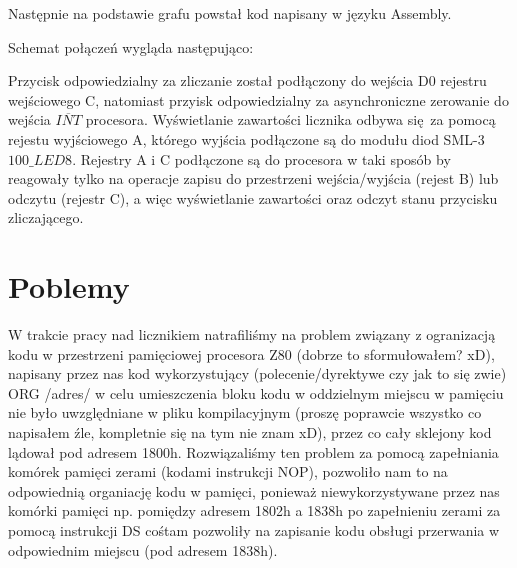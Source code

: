 \documentclass[fleqn]{article}
\begin{document}
Następnie na podstawie grafu powstał kod napisany w języku Assembly.

\noindent\begin{minipage}{.45\textwidth}
	
\end{minipage}\hfill
\noindent\begin{minipage}{.45\textwidth}
	
\end{minipage}\hfill

Schemat połączeń wygląda następująco:


Przycisk odpowiedzialny za zliczanie został podłączony do wejścia D0 rejestru wejściowego C, natomiast przyisk odpowiedzialny za asynchroniczne zerowanie do wejścia $\overline{INT}$ procesora.
Wyświetlanie zawartości licznika odbywa się za pomocą rejestu wyjściowego A, którego wyjścia podłączone są do modułu diod SML-3 $\textit{100\_LED8}$. Rejestry A i C podłączone są do procesora w taki sposób by reagowały tylko na operacje zapisu do przestrzeni wejścia/wyjścia (rejest B) lub odczytu (rejestr C), a więc wyświetlanie zawartości oraz odczyt stanu przycisku zliczającego.


\section{Poblemy}
W trakcie pracy nad licznikiem natrafiliśmy na problem związany z ogranizacją kodu w przestrzeni pamięciowej procesora Z80 (dobrze to sformułowałem? xD), napisany przez nas kod wykorzystujący (polecenie/dyrektywe czy jak to się zwie) ORG /adres/ w celu umieszczenia bloku kodu w oddzielnym miejscu w pamięciu nie było uwzględniane w pliku kompilacyjnym (proszę poprawcie wszystko co napisałem źle, kompletnie się na tym nie znam xD), przez co cały sklejony kod lądował pod adresem 1800h. Rozwiązaliśmy ten problem za pomocą zapełniania komórek pamięci zerami (kodami instrukcji NOP), pozwoliło nam to na odpowiednią organiację kodu w pamięci, ponieważ niewykorzystywane przez nas komórki pamięci np. pomiędzy adresem 1802h a 1838h po zapełnieniu zerami za pomocą instrukcji DS cośtam pozwoliły na zapisanie kodu obsługi przerwania w odpowiednim miejscu (pod adresem 1838h).
\end{document}
